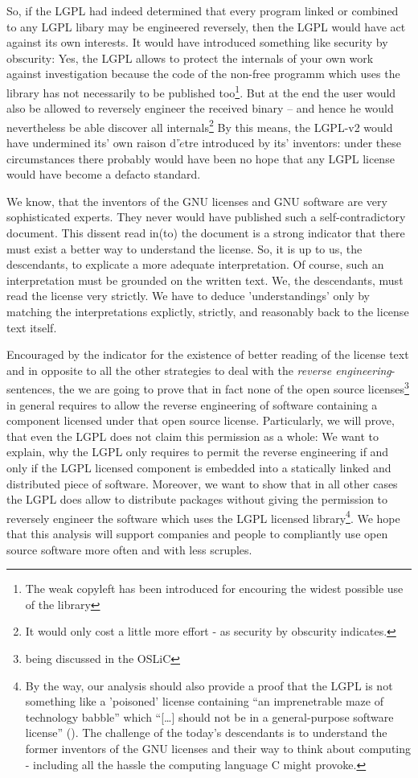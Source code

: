 So, if the LGPL had indeed determined that every program linked or combined to
any LGPL libary may be engineered reversely, then the LGPL would have act
against its own interests. It would have introduced something like security by
obscurity: Yes, the LGPL allows to protect the internals of your own work
against investigation because the code of the non-free programm which uses the
library has not necessarily to be published too\footnote{The weak copyleft has
been introduced for encouring the widest possible use of the library}. But at
the end the user would also be allowed to reversely engineer the received binary
-- and hence he would nevertheless be able discover all internals\footnote{It
would only cost a little more effort - as security by obscurity indicates.} By
this means, the LGPL-v2 would have undermined its' own raison d'$\grave{e}$tre
introduced by its' inventors: under these circumstances there probably would
have been no hope that any LGPL license would have become a defacto standard.

We know, that the inventors of the GNU licenses and GNU software are very
sophisticated experts. They never would have published such a self-contradictory
document. This dissent read in(to) the document is a strong indicator that there
must exist a better way to understand the license. So, it is up to us, the
descendants, to explicate a more adequate interpretation. Of course, such an
interpretation must be grounded on the written text. We, the descendants, must
read the license very strictly. We have to deduce 'understandings' only by
matching the interpretations explictly, strictly, and reasonably back to the
license text itself.

Encouraged by the indicator for the existence of better reading of the license
text and in opposite to all the other strategies to deal with the \emph{reverse
engineering}-sentences, the we are going to prove that in fact none of
the open source licenses\footnote{being discussed in the OSLiC} in general requires
to allow the reverse engineering of software containing a component licensed
under that open source license. Particularly, we will prove, that even the LGPL
does not claim this permission as a whole: We want to explain, why the LGPL
only requires to permit the reverse engineering if and only if the LGPL licensed
component is embedded into a statically linked and distributed piece of
software. Moreover, we want to show that in all other cases the LGPL does allow
to distribute packages without giving the permission to reversely engineer the
software which uses the LGPL licensed library\footnote{By the way, our analysis
should also provide a proof that the LGPL is not something like a 'poisoned'
license containing \enquote{an imprenetrable maze of technology babble} which
\enquote{[\ldots] should not be in a general-purpose software license}
(\cite[cf.][124]{Rosen2005a}). The challenge of the today's descendants is to
understand the former inventors of the GNU licenses and their way to think about
computing - including all the hassle the computing language C might provoke.}.
We hope that this analysis will support companies and people to compliantly use
open source software more often and with less scruples.

